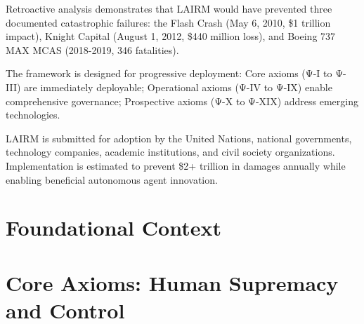 \documentclass[12pt,a4paper,twoside,openright]{book}
\begin{document}
Retroactive analysis demonstrates that LAIRM would have prevented three documented catastrophic failures: the Flash Crash (May 6, 2010, \$1 trillion impact), Knight Capital (August 1, 2012, \$440 million loss), and Boeing 737 MAX MCAS (2018-2019, 346 fatalities).

The framework is designed for progressive deployment: Core axioms (Ψ-I to Ψ-III) are immediately deployable; Operational axioms (Ψ-IV to Ψ-IX) enable comprehensive governance; Prospective axioms (Ψ-X to Ψ-XIX) address emerging technologies.

LAIRM is submitted for adoption by the United Nations, national governments, technology companies, academic institutions, and civil society organizations. Implementation is estimated to prevent \$2+ trillion in damages annually while enabling beneficial autonomous agent innovation.

\cleardoublepage

\tableofcontents

\cleardoublepage
\listoffigures

\cleardoublepage
\listoftables

\mainmatter
\pagestyle{fancy}

\part{Foundational Context}








\part{Core Axioms: Human Supremacy and Control}
\end{document}

